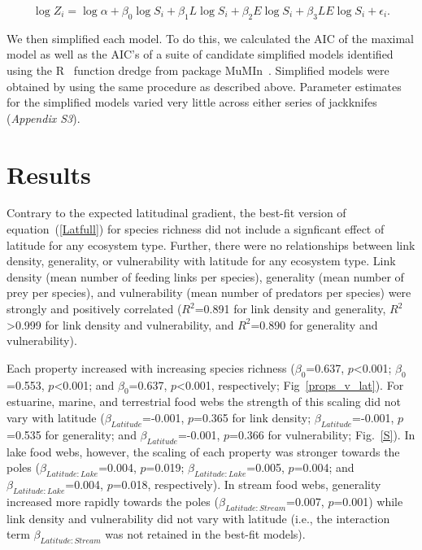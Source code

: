 \documentclass[12pt]{article}
\begin{document}
    \begin{equation}
    \label{LogLat}
    \log{Z_{i}} = \log{\alpha}+\beta_{0}\log{S_{i}} + \beta_{1}L\log{S_{i}} +\beta_{2}E\log{S_{i}} +\beta_{3}LE\log{S_{i}} +\epsilon_{i} .
    \end{equation}

    We then simplified each model. To do this, we calculated the AIC of the
    maximal model as well as the AIC's of a suite of candidate simplified
    models identified using the R~\cite{R} function dredge from package
    MuMIn~\cite{MuMIn}.  Simplified models were obtained by using the same
    procedure as described above. Parameter estimates for the simplified models
    varied very little across either series of jackknifes (\emph{Appendix S3}).


\section*{Results}

  Contrary to the expected latitudinal gradient, the best-fit version of
  equation~(\ref{Latfull}) for species richness did not  include a signficant
  effect of latitude for any  ecosystem type. Further, there were no
  relationships between link density, generality, or vulnerability with
  latitude for any ecosystem type. Link density (mean number of feeding links
  per species), generality (mean number of prey per species), and
  vulnerability (mean number of predators per species) were strongly and
  positively correlated ($R^2$=0.891 for link density and generality,
  $R^2$\textgreater0.999 for link density and vulnerability, and $R^2$=0.890
  for generality and vulnerability).


  Each property increased with increasing
  species richness ($\beta_0$=0.637, $p$\textless0.001; $\beta_0$=0.553,
  $p$\textless0.001; and $\beta_0$=0.637, $p$\textless0.001, respectively;
  Fig~\ref{props_v_lat}). For estuarine, marine, and terrestrial food webs the
  strength of this scaling did not vary with latitude
  ($\beta_{Latitude}$=-0.001, $p$=0.365 for link density;
  $\beta_{Latitude}$=-0.001, $p$=0.535 for generality; and
  $\beta_{Latitude}$=-0.001, $p$=0.366 for vulnerability; Fig.~\ref{S}). In
  lake food webs, however, the scaling of each property was stronger towards
  the poles ($\beta_{Latitude:Lake}$=0.004, $p$=0.019;
  $\beta_{Latitude:Lake}$=0.005, $p$=0.004; and
  $\beta_{Latitude:Lake}$=0.004, $p$=0.018, respectively). In stream food
  webs, generality increased more rapidly towards the poles
  ($\beta_{Latitude:Stream}$=0.007, $p$=0.001) while link density and
  vulnerability did not vary with latitude (i.e., the interaction term 
  $\beta_{Latitude:Stream}$ was not retained in the best-fit models).
\end{document}
